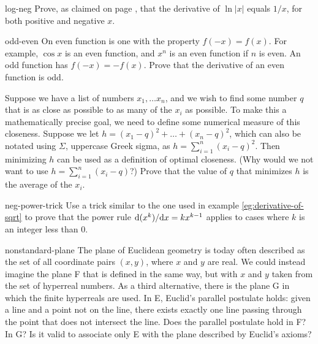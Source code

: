 \begin{hwsection}
\begin{hwwithsoln}{log-neg}
Prove, as claimed on page \pageref{log-neg},
that the derivative of $\ln |x|$ equals $1/x$, for both positive and negative $x$.
\end{hwwithsoln}

\begin{hwwithsoln}{odd-even}
On even function is one with the property $f(-x)=f(x)$. For example, $\cos x$ is an even function, and $x^n$ is an even function if
$n$ is even. An odd function has $f(-x)=-f(x)$. Prove that the derivative of an even function is odd.
\end{hwwithsoln}

\begin{hw}
Suppose we have a list of numbers $x_1,\ldots x_n$, and we wish to find some number $q$ that is as close as possible
to as many of the $x_i$ as possible. To make this a mathematically precise goal, we need to define some numerical
measure of this closeness. Suppose we let $h=(x_1-q)^2+\ldots+(x_n-q)^2$, which can also be notated using $\Sigma$, uppercase Greek
sigma, as $h=\sum_{i=1}^n (x_i-q)^2$. Then minimizing $h$ can be used as a definition of optimal closeness.
(Why would we not want to use $h=\sum_{i=1}^n (x_i-q)$?) Prove that the value of $q$ that minimizes $h$ is
the average of the $x_i$.
\end{hw}

\begin{hwwithsoln}[2]{neg-power-trick}
Use a trick similar to the one used in example \ref{eg:derivative-of-sqrt} to prove that the power
rule $\textup{d}(x^k)/\textup{d} x=kx^{k-1}$ applies to cases where $k$ is an integer less than 0.
\end{hwwithsoln}

\begin{hwwithsoln}[2]{nonstandard-plane}
The plane of Euclidean geometry is today often described as the set of all coordinate pairs $(x,y)$, where
$x$ and $y$ are real. We could instead imagine the plane F that is defined in the same way, but with $x$ and $y$ taken from the
set of hyperreal numbers. As a third alternative, there is the plane G in which the finite hyperreals are used.
In E, Euclid's parallel postulate holds: given a line and a point not on the line, there exists exactly one line passing
through the point that does not intersect the line. Does the parallel postulate hold in F? In G?
Is it valid to associate only E with the plane described by Euclid's axioms?
\end{hwwithsoln}


\end{hwsection}
